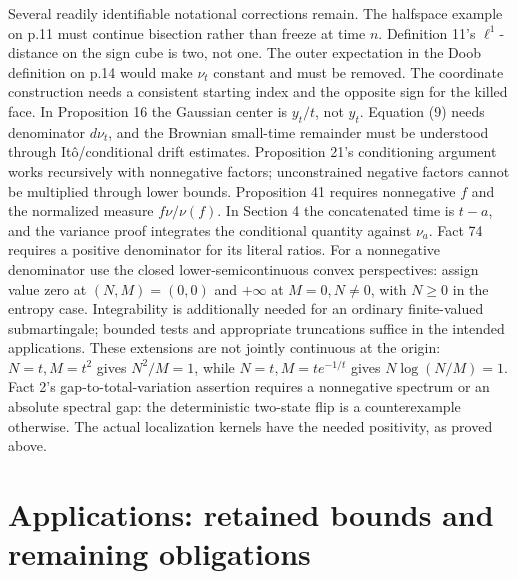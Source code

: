 \documentclass[10pt]{article}
\begin{document}
Several readily identifiable notational corrections remain. The halfspace example on p.11 must continue bisection rather than freeze at time \(n\). Definition 11’s \(\ell^1\)-distance on the sign cube is two, not one. The outer expectation in the Doob definition on p.14 would make \(\nu_t\) constant and must be removed. The coordinate construction needs a consistent starting index and the opposite sign for the killed face. In Proposition 16 the Gaussian center is \(y_t/t\), not \(y_t\). Equation (9) needs denominator \(d\nu_t\), and the Brownian small-time remainder must be understood through Itô/conditional drift estimates. Proposition 21’s conditioning argument works recursively with nonnegative factors; unconstrained negative factors cannot be multiplied through lower bounds. Proposition 41 requires nonnegative \(f\) and the normalized measure \(f\nu/\nu(f)\). In Section 4 the concatenated time is \(t-a\), and the variance proof integrates the conditional quantity against \(\nu_a\). Fact 74 requires a positive denominator for its literal ratios. For a nonnegative denominator use the closed lower-semicontinuous convex perspectives: assign value zero at \((N,M)=(0,0)\) and \(+\infty\) at \(M=0,N\ne0\), with \(N\ge0\) in the entropy case. Integrability is additionally needed for an ordinary finite-valued submartingale; bounded tests and appropriate truncations suffice in the intended applications. These extensions are not jointly continuous at the origin: \(N=t,M=t^2\) gives \(N^2/M=1\), while \(N=t,M=t e^{-1/t}\) gives \(N\log(N/M)=1\). Fact 2’s gap-to-total-variation assertion requires a nonnegative spectrum or an absolute spectral gap: the deterministic two-state flip is a counterexample otherwise. The actual localization kernels have the needed positivity, as proved above.\par
\section*{Applications: retained bounds and remaining obligations}
\end{document}
